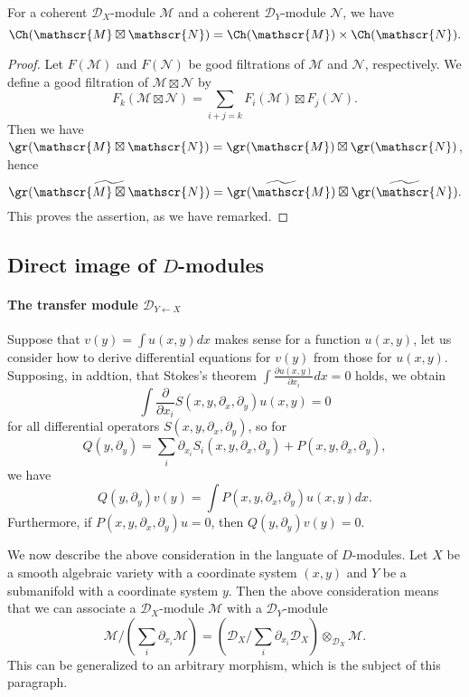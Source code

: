 \begin{proposition}\label{D-module characteristic variety of external tensor char}
For a coherent $\mathscr{D}_X$-module $\mathscr{M}$ and a coherent $\mathscr{D}_Y$-module $\mathscr{N}$, we have
\[\Ch(\mathscr{M}\boxtimes\mathscr{N})=\Ch(\mathscr{M})\times\Ch(\mathscr{N}).\]
\end{proposition}
\begin{proof}
Let $F(\mathscr{M})$ and $F(\mathscr{N})$ be good filtrations of $\mathscr{M}$ and $\mathscr{N}$, respectively. We define a good filtration of $\mathscr{M}\boxtimes\mathscr{N}$ by
\[F_k(\mathscr{M}\boxtimes\mathscr{N})=\sum_{i+j=k}F_i(\mathscr{M})\boxtimes F_j(\mathscr{N}).\]
Then we have $\gr(\mathscr{M}\boxtimes\mathscr{N})=\gr(\mathscr{M})\boxtimes\gr(\mathscr{N})$, hence
\[\widetilde{\gr(\mathscr{M}\boxtimes\mathscr{N})}=\widetilde{\gr(\mathscr{M})}\boxtimes\widetilde{\gr(\mathscr{N})}.\]
This proves the assertion, as we have remarked.
\end{proof}

\subsection{Direct image of \texorpdfstring{$D$}{D}-modules}
\paragraph{The transfer module \texorpdfstring{$\mathscr{D}_{Y\leftarrow X}$}{D}}
Suppose that $v(y)=\int u(x,y)dx$ makes sense for a function $u(x,y)$, let us consider how to derive differential equations for $v(y)$ from those for $u(x,y)$. Supposing, in addtion, that Stokes's theorem $\int\frac{\partial u(x,y)}{\partial x_i}dx=0$ holds, we obtain
\[\int\frac{\partial}{\partial x_i}S(x,y,\partial_x,\partial_y)u(x,y)=0\]
for all differential operators $S(x,y,\partial_x,\partial_y)$, so for
\[Q(y,\partial_y)=\sum_i\partial_{x_i}S_i(x,y,\partial_x,\partial_y)+P(x,y,\partial_x,\partial_y),\]
we have
\[Q(y,\partial_y)v(y)=\int P(x,y,\partial_x,\partial_y)u(x,y)dx.\]
Furthermore, if $P(x,y,\partial_x,\partial_y)u=0$, then $Q(y,\partial_y)v(y)=0$.\par
We now describe the above consideration in the languate of $D$-modules. Let $X$ be a smooth algebraic variety with a coordinate system $(x,y)$ and $Y$ be a submanifold with a coordinate system $y$. Then the above consideration means that we can associate a $\mathscr{D}_X$-module $\mathscr{M}$ with a $\mathscr{D}_Y$-module
\[\mathscr{M}/(\sum_i\partial_{x_i}\mathscr{M})=(\mathscr{D}_X/\sum_i\partial_{x_i}\mathscr{D}_X)\otimes_{\mathscr{D}_X}\mathscr{M}.\]
This can be generalized to an arbitrary morphism, which is the subject of this paragraph.\par

